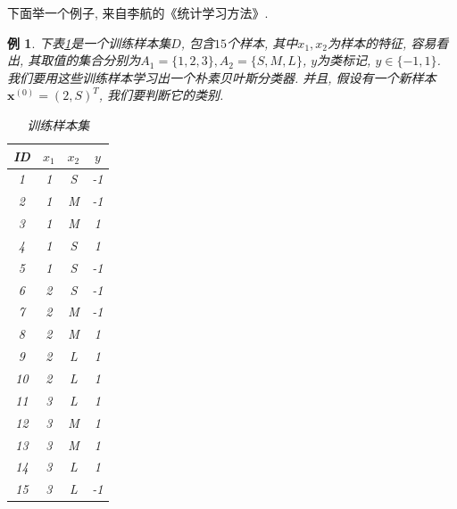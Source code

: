 \documentclass[a4paper,UTF8]{ctexart}
\theoremstyle{plain} \newtheorem{theorem}{定理}[section]
\theoremstyle{plain} \newtheorem{definition}{定义}[section]
\theoremstyle{plain} \newtheorem{lemma}{引理}[section]
\theoremstyle{plain} \newtheorem{proposition}{命题}[section]
\theoremstyle{plain} \newtheorem{example}{例}[section]
\theoremstyle{plain} \newtheorem{remark}{注}[section]
\theoremstyle{plain} \newtheorem{corollary}{推论}[section]
\begin{document}
下面举一个例子, 来自李航的《统计学习方法》.

\begin{example}
下表\ref{examp1}是一个训练样本集$D$, 包含$15$个样本, 其中$x_1, x_2$为样本的特征, 容易看出, 其取值的集合分别为$A_{1} = \{1, 2, 3\}, A_{2} = \{S, M, L\}$, $y$为类标记, $y \in \{-1, 1\}$. 我们要用这些训练样本学习出一个朴素贝叶斯分类器. 并且, 假设有一个新样本$\bm{x}^{(0)} = (2, S)^{T}$, 我们要判断它的类别.

\begin{table}[!htb]
\centering
\caption{训练样本集}
\label{examp1}
\begin{tabular}{cccc}
	\hline
    \textbf{ID} & \textbf{$x_1$} & \textbf{$x_2$} & \textbf{$y$} \\
    \hline
    1   &  1  &  S  &  -1 \\
    \hline
    2   &  1  &  M  &  -1 \\
    \hline
    3   &  1  &  M  &  1 \\
    \hline
    4   &  1  &  S  &  1 \\
    \hline
    5   &  1  &  S  &  -1 \\
    \hline
    6   &  2  &  S  &  -1 \\
    \hline
    7   &  2  &  M  &  -1 \\
    \hline
    8   &  2  &  M  &  1 \\
    \hline
    9   &  2  &  L  &  1 \\
    \hline
    10   &  2  &  L  &  1 \\
    \hline
    11   &  3  &  L  &  1 \\
    \hline
    12   &  3  &  M  &  1 \\
    \hline
    13   &  3  &  M  &  1 \\
    \hline
    14   &  3  &  L  &  1 \\
    \hline
    15   &  3  &  L  &  -1 \\
    \hline
\end{tabular}
\end{table}

\end{example}
\end{document}
